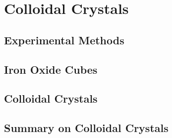 \documentclass[\main/dresen_thesis.tex]{subfiles}
\renewcommand{\thisPath}{\main/chapters/colloidalCrystals}
\begin{document}
\chapter{Colloidal Crystals}\label{ch:colloidalCrystals}

  
  \FloatBarrier
  \clearpage

  \section{Experimental Methods}
    
      \FloatBarrier
      \clearpage

  \section{Iron Oxide Cubes}
    
      \FloatBarrier
      \clearpage

  \section{Colloidal Crystals}
    
    \FloatBarrier
      \clearpage

  \section{Summary on Colloidal Crystals}
    
    \FloatBarrier
\end{document}
